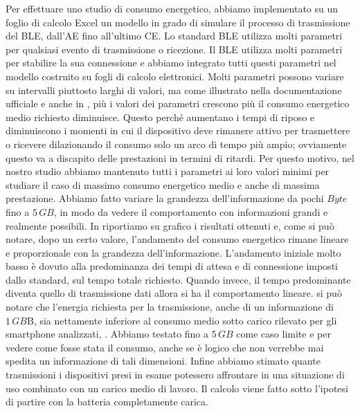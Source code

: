 Per effettuare uno studio di consumo energetico, abbiamo implementato su un foglio di calcolo Excel un modello in grado di simulare il processo di trasmissione del \acs{BLE}, dall'\acf{AE} fino all'ultimo \acf{CE}. Lo standard \acs{BLE} utilizza molti parametri per qualsiasi evento di trasmissione o ricezione. Il BLE utilizza molti parametri per stabilire la sua connessione e abbiamo integrato tutti questi parametri nel modello costruito su fogli di calcolo elettronici. Molti parametri possono variare su intervalli piuttosto larghi di valori, ma come illustrato nella documentazione ufficiale \cite{BT-CoreSpec4.0} e anche in \cite{sensor2012}, più i valori dei parametri crescono più il consumo energetico medio richiesto diminuisce. Questo perché aumentano i tempi di riposo e diminuiscono i momenti in cui il dispositivo deve rimanere attivo per trasmettere o ricevere dilazionando il consumo solo un arco di tempo più ampio; ovviamente questo va a discapito delle prestazioni in termini di ritardi. Per questo motivo, nel nostro studio abbiamo mantenuto tutti i parametri ai loro valori minimi per studiare il caso di massimo consumo energetico medio e anche di massima prestazione. Abbiamo fatto variare la grandezza dell'informazione da pochi $Byte$ fino a $5\,GB$, in modo da vedere il comportamento con informazioni grandi e realmente possibili. In  riportiamo su grafico i risultati ottenuti e, come si può notare, dopo un certo valore, l'andamento del consumo energetico rimane lineare e proporzionale con la grandezza dell'informazione. L'andamento iniziale molto basso è dovuto alla predominanza dei tempi di attesa e di connessione imposti dallo standard, sul tempo totale richiesto. Quando invece, il tempo predominante diventa quello di trasmissione dati allora si ha il comportamento lineare. si può notare che l'energia richiesta per la trasmissione, anche di un informazione di $1\,GB$B, sia nettamente inferiore al consumo medio sotto carico rilevato per gli smartphone analizzati, . Abbiamo testato fino a $5\,GB$ come caso limite e per vedere come fosse stata il consumo, anche se è logico che non verrebbe mai spedita un informazione di tali dimensioni. Infine abbiamo stimato quante trasmissioni i dispositivi presi in esame potessero affrontare in una situazione di uso combinato con un carico medio di lavoro. Il calcolo viene fatto sotto l'ipotesi di partire con la batteria completamente carica.
